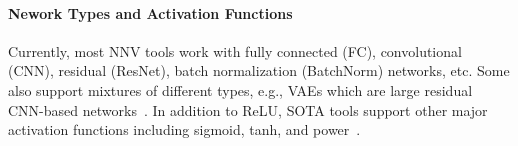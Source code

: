 \documentclass[oneside,11pt,dvipsnames]{book}
\numberwithin{equation}{section}
\theoremstyle{definition}
\theoremstyle{remark}
\newcommand{\tvn}[1]{\iftoggle{usecomment}{{\color{red}{[TVN]: #1}}}{}}
\newcommand{\hd}[1]{\iftoggle{usecomment}{{\color{blue}{[HD]: #1}}}{}}
\newcommand{\crown}{\texttt{$\alpha\beta$-CROWN}}
\begin{document}

\paragraph{Nework Types and Activation Functions} Currently, most NNV tools work with fully connected (FC), convolutional (CNN), residual (ResNet), batch normalization (BatchNorm) networks, etc.
Some also support mixtures of different types, e.g., VAEs which are large residual CNN-based networks~\cite{duong2025compositional}.
In addition to ReLU, SOTA tools support other major activation functions including sigmoid, tanh, and power~\cite{kaulen20256thinternationalverificationneural}. %


\end{document}
